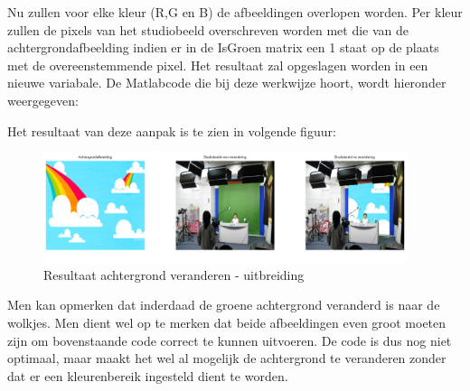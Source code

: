			\par Nu zullen voor elke kleur (R,G en B) de afbeeldingen overlopen worden. Per kleur zullen de pixels van het studiobeeld overschreven worden met die van de achtergrondafbeelding 
			indien er in de IsGroen matrix een 1 staat op de plaats met de overeenstemmende pixel. Het resultaat zal opgeslagen worden in een nieuwe variabale.
		    De Matlabcode die bij deze werkwijze hoort, wordt hieronder weergegeven:  \bigskip
			
			
			
			\par Het resultaat van deze aanpak is te zien in volgende figuur:
			
				\begin{figure}[H]
				\centering
				\includegraphics[width=0.95\textwidth]{Images/resultaat_chromakey_extra.png}
				\caption{Resultaat achtergrond veranderen - uitbreiding}
				\label{fig:resultaat_chromakey_extra}
				\end{figure}
				
			\par Men kan opmerken dat inderdaad de groene achtergrond veranderd is naar de wolkjes. Men dient wel op te merken dat beide afbeeldingen even groot moeten zijn om bovenstaande code
			correct te kunnen uitvoeren. De code is dus nog niet optimaal, maar maakt het wel al mogelijk de achtergrond te veranderen zonder dat er een kleurenbereik ingesteld dient te worden.
			